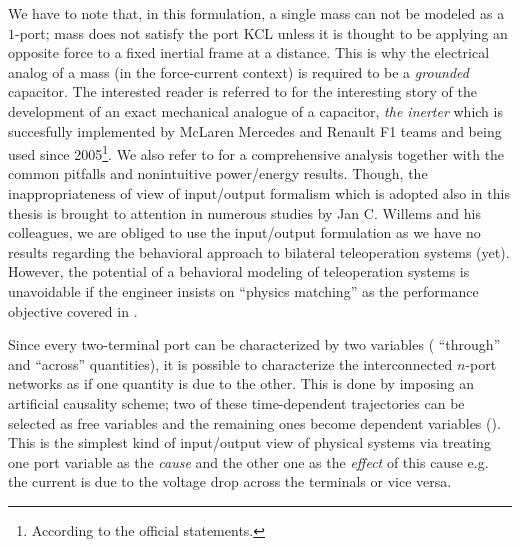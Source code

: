 \begin{rem}
We have to note that, in this formulation, a single mass can not be modeled as a $1$-port; mass does not satisfy the 
port KCL unless it is thought to be applying an opposite force to a fixed inertial frame at a distance. This is why the electrical analog 
of a mass (in the force-current context) is required to be a \emph{grounded} capacitor. The interested reader is referred to \cite{smith} 
for the interesting story of the development of an exact mechanical analogue of a capacitor, \emph{the inerter} which is succesfully 
implemented by McLaren Mercedes and Renault F1 teams and being used since 2005\footnote{According to the official statements.}. We also 
refer to \cite{willemsCSM} for a comprehensive analysis together with the common pitfalls and nonintuitive power/energy results. Though, 
the inappropriateness of view of input/output formalism which is adopted also in this thesis is brought to attention in numerous 
studies by Jan C. Willems and his colleagues, we are obliged to use the input/output formulation as we have no results regarding 
the behavioral approach to bilateral teleoperation systems (yet). However, the potential of a behavioral modeling of teleoperation 
systems is unavoidable if the engineer insists on \enquote{physics matching} as the performance objective covered in .
\end{rem}


Since every two-terminal port can be characterized by two variables ( ``through'' and ``across'' quantities), it is possible to 
characterize the interconnected $n$-port networks as if one quantity is due to the other. This is done by imposing an artificial 
causality scheme; two of these time-dependent trajectories can be selected as free variables and the remaining ones become dependent 
variables (\cite{behavbook}). This is the simplest kind of input/output view of physical systems via treating one port variable as the 
\emph{cause} and the other one as the \emph{effect} of this cause e.g. the current is due to the voltage drop across the terminals or 
vice versa. 

